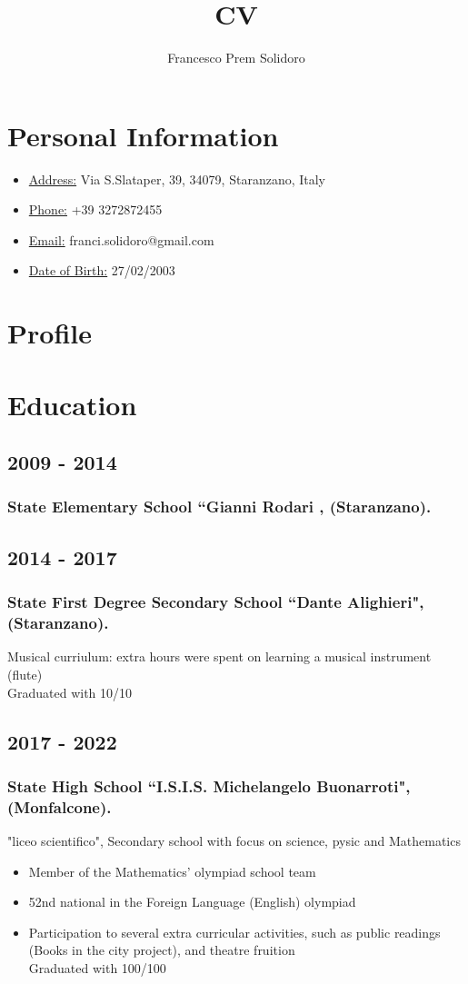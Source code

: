 \documentclass[12pt]{article}
\author{Francesco Prem Solidoro}
\title{CV}
\renewcommand{\maketitle}{
\begin{center}
{\huge\bfseries
\theauthor}
\end{center}
}
\begin{document}
\maketitle
\section{Personal Information}
\begin{itemize}
	\item \underline {Address:} Via S.Slataper, 39, 34079, Staranzano, Italy
	\item \underline {Phone:} +39 3272872455
	\item \underline{Email:} franci.solidoro@gmail.com
	\item \underline{Date of Birth:} 27/02/2003
\end{itemize}
\section{Profile}
\section{Education}
\subsection{2009 - 2014}
\subsubsection{State Elementary School ``Gianni Rodari , (Staranzano).}
\subsection{2014 - 2017}
\subsubsection{State First Degree Secondary School ``Dante Alighieri", (Staranzano).}
Musical curriulum: extra hours were spent on learning a musical instrument (flute) \\
Graduated with 10/10

\subsection{2017 - 2022}
\subsubsection{State High School ``I.S.I.S. Michelangelo Buonarroti", (Monfalcone).}
"liceo scientifico", Secondary school with focus on science, pysic and Mathematics
\begin{itemize}
	\item{Member of the Mathematics' olympiad school team}
	\item{52nd national in the Foreign Language (English) olympiad}
	\item{Participation to several extra curricular activities, such as public readings (Books in the city project), and theatre fruition} \\
Graduated with 100/100
\end{itemize}
\end{document}
